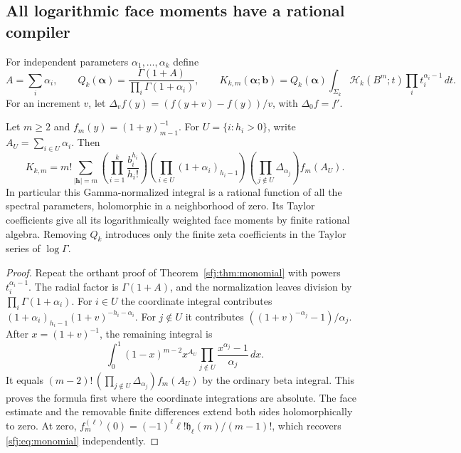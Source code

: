 \subsection{All logarithmic face moments have a rational compiler}

For independent parameters $\alpha_1,\ldots,\alpha_k$ define
\[
 A=\sum_i\alpha_i,\qquad
 Q_k(\boldsymbol\alpha)=
       \frac{\Gamma(1+A)}{\prod_i\Gamma(1+\alpha_i)},\qquad
 K_{k,m}(\boldsymbol\alpha;\boldsymbol b)
   =Q_k(\boldsymbol\alpha)
       \int_{\Sigma_k}\mathcal H_k(B^m;t)
                                      \prod_i t_i^{\alpha_i-1}\,dt.
\]
For an increment $v$, let
$\Delta_v f(y)=(f(y+v)-f(y))/v$, with $\Delta_0f=f'$.

\begin{theorem}
\label{sfj:thm:rational}
Let $m\ge2$ and $f_m(y)=(1+y)_{m-1}^{-1}$.  For
$U=\{i:h_i>0\}$, write $A_U=\sum_{i\in U}\alpha_i$.  Then
\begin{equation}\label{sfj:eq:rational}
 \boxed{\displaystyle
 K_{k,m}=m!\sum_{|\boldsymbol h|=m}
  \left(\prod_{i=1}^k\frac{b_i^{h_i}}{h_i!}\right)
  \left(\prod_{i\in U}(1+\alpha_i)_{h_i-1}\right)
  \left(\prod_{j\notin U}\Delta_{\alpha_j}\right)f_m(A_U).}
\end{equation}
In particular this Gamma-normalized integral is a rational function of
all the spectral parameters, holomorphic in a neighborhood of zero.
Its Taylor coefficients give all its logarithmically weighted face
moments by finite rational algebra.  Removing $Q_k$ introduces only
the finite zeta coefficients in the Taylor series of $\log\Gamma$.
\end{theorem}
\begin{proof}
Repeat the orthant proof of Theorem~\ref{sfj:thm:monomial} with powers
$t_i^{\alpha_i-1}$.  The radial factor is $\Gamma(1+A)$, and the
normalization leaves division by $\prod_i\Gamma(1+\alpha_i)$.
For $i\in U$ the coordinate integral contributes
$(1+\alpha_i)_{h_i-1}(1+v)^{-h_i-\alpha_i}$.  For $j\notin U$
it contributes
$((1+v)^{-\alpha_j}-1)/\alpha_j$.
After $x=(1+v)^{-1}$, the remaining integral is
\[
 \int_0^1(1-x)^{m-2}x^{A_U}
            \prod_{j\notin U}\frac{x^{\alpha_j}-1}{\alpha_j}\,dx.
\]
It equals
$(m-2)!\,(\prod_{j\notin U}\Delta_{\alpha_j})f_m(A_U)$ by the
ordinary beta integral.  This proves the formula first where the
coordinate integrations are absolute.  The face estimate and the
removable finite differences extend both sides holomorphically to
zero.  At zero, $f_m^{(\ell)}(0)=
(-1)^\ell\ell!\mathfrak h_\ell(m)/(m-1)!$, which recovers
\eqref{sfj:eq:monomial} independently.
\end{proof}

